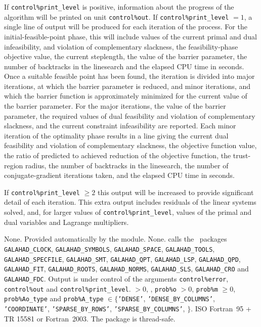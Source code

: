 \documentclass{galahad}
\newcommand{\packagename}{CLLS}
\begin{document}

\galinfo
If {\tt control\%print\_level} is positive, information about the progress
of the algorithm will be printed on unit {\tt control\-\%out}.
If {\tt control\%print\_level} $= 1$, a single line of output will be produced
for each iteration of the process.
For the initial-feasible-point phase,
this will include values of the current primal and dual infeasibility, and
violation of complementary slackness, the feasibility-phase objective value,
the current steplength, the value of the barrier parameter, the
number of backtracks in the linesearch and the elapsed CPU time in seconds.
Once a suitable feasible point has been found, the iteration is divided
into major iterations, at which the barrier parameter is reduced, and
minor iterations, and which the barrier function is approximately minimized
for the current value of the barrier parameter. For the major iterations,
the value of the barrier parameter, the required values of
dual feasibility and violation of complementary slackness, and the current
constraint infeasibility are reported. Each minor iteration of the
optimality phase results in a line giving
the current dual feasibility and violation of complementary slackness, the
objective function value, the ratio of predicted to achieved reduction
of the objective function, the trust-region radius, the
number of backtracks in the linesearch, the number of conjugate-gradient
iterations taken, and the elapsed CPU time in seconds.

If {\tt control\%print\_level} $\geq 2$ this
output will be increased to provide significant detail of each iteration.
This extra output includes residuals of the linear systems solved, and,
for larger values of {\tt control\%print\_level}, values of the primal and dual
variables and Lagrange multipliers.


\galgeneral

\galcommon None.
\galworkspace Provided automatically by the module.
\galroutines None.
\galmodules {\tt \packagename\_solve} calls the \galahad\ packages
{\tt GALAHAD\_CLOCK},
{\tt GALAHAD\_SY\-M\-BOLS},
{\tt GALA\-HAD\_SPACE},
{\tt GAL\-AHAD\_TOOLS},
{\tt GALAHAD\_SPECFILE},
{\tt GALAHAD\_SMT},
{\tt GALAHAD\_QPT},
{\tt GALAHAD\_LSP},
{\tt GALAHAD\_QPD},
{\tt GALAHAD\_FIT},
{\tt GALAHAD\_ROOTS},
{\tt GALAHAD\_NORMS},
{\tt GALAHAD\_SLS},
{\tt GALAHAD\_CRO}
and
{\tt GAL\-AHAD\_FDC}.
\galio Output is under control of the arguments
 {\tt control\%error}, {\tt control\%out} and {\tt control\%print\_level}.
 $> 0$, , {\tt prob\%o} $> 0$,
{\tt prob\%m} $\geq  0$,
{\tt prob\%Ao\_type} and {\tt prob\%A\_type} $\in \{${\tt 'DENSE'},
 {\tt 'DENSE\_BY\_COLUMNS'},  {\tt 'COORDINATE'},
{\tt 'SPARSE\_BY\_\-ROWS'}, {\tt 'SPARSE\_BY\_\-COLUMNS'},
$\}$.
\galportability ISO Fortran~95 + TR 15581 or Fortran~2003.
The package is thread-safe.
\end{document}
